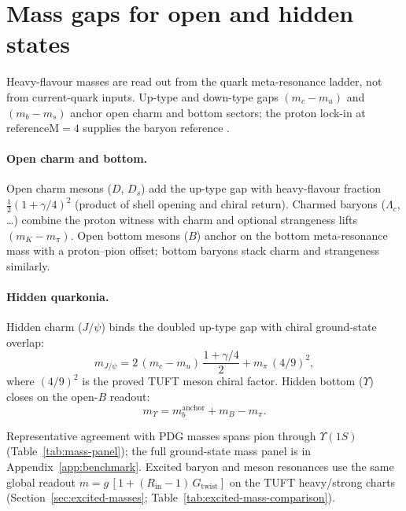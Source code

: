 \documentclass[11pt]{amsart}
\begin{document}
\section{Mass gaps for open and hidden states}
\label{sec:mass}

Heavy-flavour masses are read out from the quark meta-resonance ladder, not from
current-quark inputs.
Up-type and down-type gaps $(m_c-m_u)$ and $(m_b-m_s)$ anchor open charm and
bottom sectors; the proton lock-in at $\mathrm{referenceM}=4$ supplies the
baryon reference \cite{hqiv-tuft-sm-lagrangian-paper}.


\paragraph{Open charm and bottom.}
Open charm mesons ($D$, $D_s$) add the up-type gap with heavy-flavour fraction
$\tfrac12(1+\gamma/4)^2$ (product of shell opening and chiral return).
Charmed baryons ($\Lambda_c$, \ldots) combine the proton witness with charm and
optional strangeness lifts $(m_K-m_\pi)$.
Open bottom mesons ($B$) anchor on the bottom meta-resonance mass with a
proton--pion offset; bottom baryons stack charm and strangeness similarly.

\paragraph{Hidden quarkonia.}
Hidden charm ($J/\psi$) binds the doubled up-type gap with chiral ground-state
overlap:
\begin{equation}
  m_{J/\psi} = 2\,(m_c-m_u)\,\frac{1+\gamma/4}{2} + m_\pi\,(4/9)^2,
\end{equation}
where $(4/9)^2$ is the proved TUFT meson chiral factor.
Hidden bottom ($\Upsilon$) closes on the open-$B$ readout:
\begin{equation}
  m_\Upsilon = m_b^{\mathrm{anchor}} + m_B - m_\pi.
\end{equation}

Representative agreement with PDG masses \cite{pdg2024} spans pion through
$\Upsilon(1S)$ (Table~\ref{tab:mass-panel}); the full ground-state mass panel is in
Appendix~\ref{app:benchmark}.
Excited baryon and meson resonances use the same global readout
$m=g\,[1+(R_{\mathrm{in}}-1)\,G_{\mathrm{twist}}]$ on the TUFT heavy/strong charts
(Section~\ref{sec:excited-masses}; Table~\ref{tab:excited-mass-comparison}).
\end{document}
